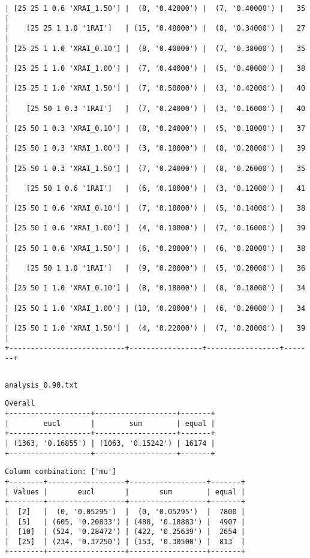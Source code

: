 \documentclass{article}
\begin{document}
\begin{verbatim}
| [25 25 1 0.6 'XRAI_1.50'] |  (8, '0.42000') |  (7, '0.40000') |   35  |
|    [25 25 1 1.0 '1RAI']   | (15, '0.48000') |  (8, '0.34000') |   27  |
| [25 25 1 1.0 'XRAI_0.10'] |  (8, '0.40000') |  (7, '0.38000') |   35  |
| [25 25 1 1.0 'XRAI_1.00'] |  (7, '0.44000') |  (5, '0.40000') |   38  |
| [25 25 1 1.0 'XRAI_1.50'] |  (7, '0.50000') |  (3, '0.42000') |   40  |
|    [25 50 1 0.3 '1RAI']   |  (7, '0.24000') |  (3, '0.16000') |   40  |
| [25 50 1 0.3 'XRAI_0.10'] |  (8, '0.24000') |  (5, '0.18000') |   37  |
| [25 50 1 0.3 'XRAI_1.00'] |  (3, '0.18000') |  (8, '0.28000') |   39  |
| [25 50 1 0.3 'XRAI_1.50'] |  (7, '0.24000') |  (8, '0.26000') |   35  |
|    [25 50 1 0.6 '1RAI']   |  (6, '0.18000') |  (3, '0.12000') |   41  |
| [25 50 1 0.6 'XRAI_0.10'] |  (7, '0.18000') |  (5, '0.14000') |   38  |
| [25 50 1 0.6 'XRAI_1.00'] |  (4, '0.10000') |  (7, '0.16000') |   39  |
| [25 50 1 0.6 'XRAI_1.50'] |  (6, '0.28000') |  (6, '0.28000') |   38  |
|    [25 50 1 1.0 '1RAI']   |  (9, '0.28000') |  (5, '0.20000') |   36  |
| [25 50 1 1.0 'XRAI_0.10'] |  (8, '0.18000') |  (8, '0.18000') |   34  |
| [25 50 1 1.0 'XRAI_1.00'] | (10, '0.28000') |  (6, '0.20000') |   34  |
| [25 50 1 1.0 'XRAI_1.50'] |  (4, '0.22000') |  (7, '0.28000') |   39  |
+---------------------------+-----------------+-----------------+-------+
\end{verbatim}

\begin{verbatim}

\end{verbatim}

\newpage
\verb|analysis_0.90.txt|
\begin{verbatim}
Overall
+-------------------+-------------------+-------+
|        eucl       |        sum        | equal |
+-------------------+-------------------+-------+
| (1363, '0.16855') | (1063, '0.15242') | 16174 |
+-------------------+-------------------+-------+
\end{verbatim}

\begin{verbatim}
Column combination: ['mu']
+--------+------------------+------------------+-------+
| Values |       eucl       |       sum        | equal |
+--------+------------------+------------------+-------+
|  [2]   |  (0, '0.05295')  |  (0, '0.05295')  |  7800 |
|  [5]   | (605, '0.20833') | (488, '0.18883') |  4907 |
|  [10]  | (524, '0.28472') | (422, '0.25639') |  2654 |
|  [25]  | (234, '0.37250') | (153, '0.30500') |  813  |
+--------+------------------+------------------+-------+
\end{verbatim}
\end{document}
